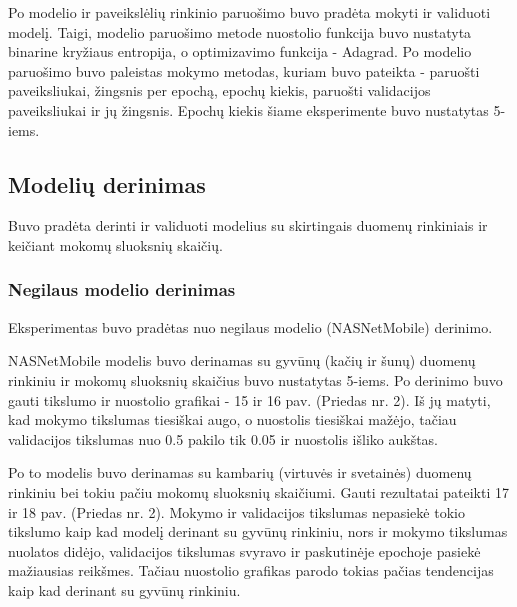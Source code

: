 \documentclass{VUMIFPSbakalaurinis}
\begin{document}
Po modelio ir paveikslėlių rinkinio paruošimo buvo pradėta mokyti ir validuoti modelį. Taigi, modelio paruošimo metode nuostolio 
funkcija buvo nustatyta binarine kryžiaus entropija, o optimizavimo funkcija - Adagrad. Po modelio paruošimo buvo paleistas mokymo metodas, kuriam buvo pateikta - paruošti paveiksliukai, žingsnis per epochą, epochų kiekis, 
paruošti validacijos paveiksliukai ir jų žingsnis. Epochų kiekis šiame eksperimente buvo nustatytas 5-iems.

\subsection{Modelių derinimas}
Buvo pradėta derinti ir validuoti modelius su skirtingais duomenų rinkiniais ir keičiant mokomų sluoksnių skaičių.

\subsubsection{Negilaus modelio derinimas}
Eksperimentas buvo pradėtas nuo negilaus modelio (NASNetMobile) derinimo.

NASNetMobile modelis buvo derinamas su gyvūnų (kačių ir šunų) duomenų rinkiniu ir mokomų sluoksnių skaičius buvo nustatytas 5-iems.
Po derinimo buvo gauti tikslumo ir nuostolio grafikai - 15 ir 16 pav. (Priedas nr. 2). Iš jų matyti, kad mokymo tikslumas tiesiškai augo, o nuostolis tiesiškai mažėjo, tačiau validacijos tikslumas nuo 0.5 pakilo tik 0.05 ir nuostolis išliko aukštas.

Po to modelis buvo derinamas su kambarių (virtuvės ir svetainės) duomenų rinkiniu bei tokiu pačiu mokomų sluoksnių skaičiumi.
Gauti rezultatai pateikti 17 ir 18 pav. (Priedas nr. 2). Mokymo ir validacijos tikslumas nepasiekė tokio tikslumo kaip kad modelį derinant su gyvūnų rinkiniu, nors ir mokymo tikslumas nuolatos didėjo, validacijos tikslumas svyravo ir paskutinėje epochoje pasiekė mažiausias reikšmes. Tačiau nuostolio grafikas parodo tokias pačias tendencijas kaip kad derinant su gyvūnų rinkiniu.
\end{document}
